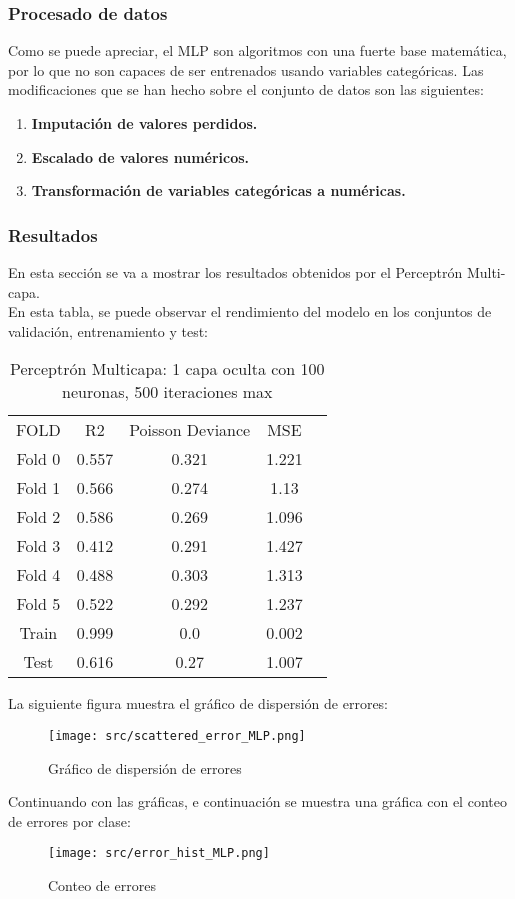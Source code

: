 \subsubsection*{Procesado de datos}
Como se puede apreciar, el MLP son algoritmos con una fuerte base matemática, por lo que no son capaces de ser entrenados usando variables categóricas. Las modificaciones que se han hecho sobre el conjunto de datos son las siguientes:
\begin{enumerate}
	\item \textbf{Imputación de valores perdidos.}
	\item \textbf{Escalado de valores numéricos.}
	\item \textbf{Transformación de variables categóricas a numéricas.}
\end{enumerate}
\subsubsection*{Resultados}
En esta sección se va a mostrar los resultados obtenidos por el Perceptrón Multi-capa. \\
\linebreak
En esta tabla, se puede observar el rendimiento del modelo en los conjuntos de validación, entrenamiento y test:
\begin{table}[H]
	\centering
	\begin{tabular}{|c|c|c|c|c}
		\cline{1-4}
		FOLD   & R2    & Poisson Deviance & MSE   \\\cline{1-4}
		Fold 0 & 0.557 & 0.321            & 1.221 \\\cline{1-4}
		Fold 1 & 0.566 & 0.274            & 1.13  \\\cline{1-4}
		Fold 2 & 0.586 & 0.269            & 1.096 \\\cline{1-4}
		Fold 3 & 0.412 & 0.291            & 1.427 \\\cline{1-4}
		Fold 4 & 0.488 & 0.303            & 1.313 \\\cline{1-4}
		Fold 5 & 0.522 & 0.292            & 1.237 \\\cline{1-4}
		Train  & 0.999 & 0.0              & 0.002 \\\cline{1-4}
		Test   & 0.616 & 0.27             & 1.007 \\\cline{1-4}
	\end{tabular}
	\caption{Perceptrón Multicapa: 1 capa oculta con 100 neuronas, 500 iteraciones max}
	\label{tab:mlp_res}
\end{table}
La siguiente figura muestra el gráfico de dispersión de errores:
\begin{figure}[H]
	\centering
	\texttt{[image: src/scattered\_error\_MLP.png]}
	\caption{Gráfico de dispersión de errores}
	\label{fig:mlp_scattered}
\end{figure}
Continuando con las gráficas, e continuación se muestra una gráfica con el conteo de errores por clase:\\
\linebreak
\begin{figure}[H]
	\centering	\texttt{[image: src/error\_hist\_MLP.png]}
	\caption{Conteo de errores}
	\label{fig:mlp_error_plot}
\end{figure}
